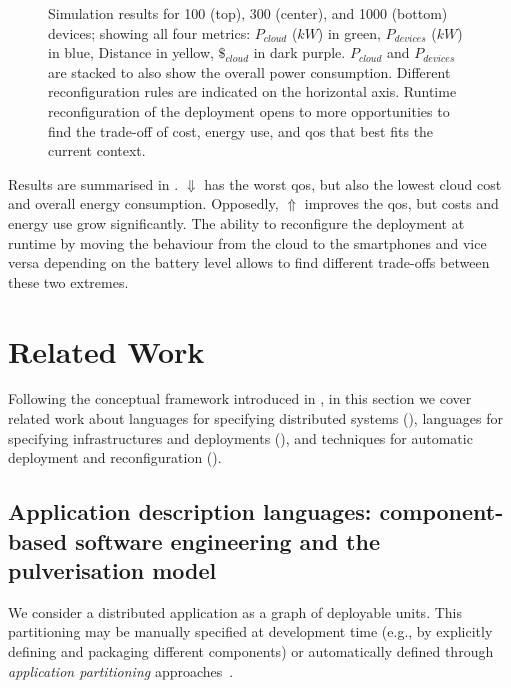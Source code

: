 \documentclass[conference]{IEEEtran}
\begin{document}
\begin{figure}
    \caption{
        Simulation results for 100 (top), 300 (center), and 1000 (bottom) devices;
        showing all four metrics:
        $P_{cloud}$ ($kW$) in green,
        $P_{devices}$ ($kW$) in blue,
        Distance in yellow, $\$_{cloud}$ in dark purple.
        $P_{cloud}$ and $P_{devices}$ are stacked to also show the overall power consumption.
        Different reconfiguration rules are indicated on the horizontal axis.
        Runtime reconfiguration of the deployment opens to more opportunities to find the trade-off of cost,
        energy use, and \ac{qos} that best fits the current context.
    }
    \label{fig:results}
\end{figure}
%
Results are summarised in .
%
$\Downarrow$ has the worst \ac{qos}, but also the lowest cloud cost and overall energy consumption.
%
Opposedly, $\Uparrow$ improves the \ac{qos}, but costs and energy use grow significantly.
%
The ability to reconfigure the deployment at runtime
by moving the behaviour from the cloud to the smartphones and vice versa
depending on the battery level allows to find different trade-offs between these two extremes.

\section{Related Work}
\label{sec:rw}

%
Following the conceptual framework introduced in ,
 in this section we cover related work about
 languages for 
 specifying distributed systems (),
 languages for specifying infrastructures and deployments (),
 and
 techniques for automatic deployment and reconfiguration ().
 
 
 
\subsection{Application description languages: component-based software engineering and the pulverisation model}
\label{sec:rw:whatsw}
%
%
We consider a distributed application 
 as a graph of deployable units.
%
This partitioning may be 
 manually specified at development time
 (e.g., by explicitly defining and packaging different components)
 or automatically defined
 through \emph{application partitioning} approaches~\cite{DBLP:journals/jnca/LiuASGBQ15}. %
 
\end{document}
